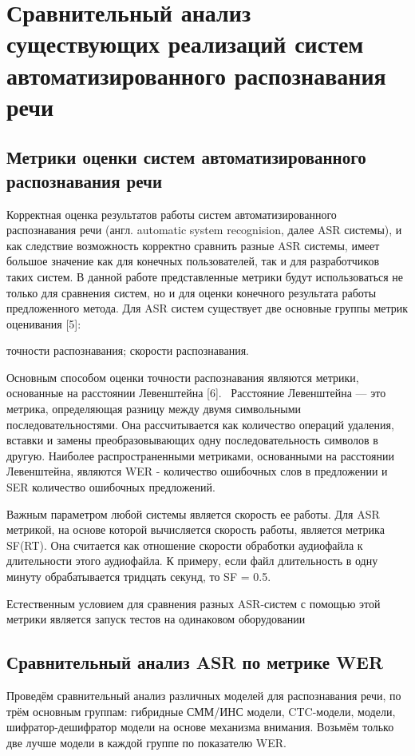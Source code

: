 \documentclass[conference]{IEEEtran}
\begin{document}
    \section{Сравнительный анализ существующих реализаций систем автоматизированного распознавания речи}

    \subsection{Метрики оценки систем автоматизированного распознавания речи}\label{AA}

    Корректная оценка результатов работы систем автоматизированного распознавания речи (англ. automatic system recognision, далее ASR системы), и как следствие возможность корректно сравнить разные ASR системы, имеет большое значение как для конечных пользователей, так и для разработчиков таких систем. В данной работе представленные метрики будут использоваться не только для сравнения систем, но и для оценки конечного результата работы предложенного метода.
    Для ASR систем существует две основные группы метрик оценивания [5]:
    \begin{itemize}
         точности распознавания;
         скорости распознавания.
    \end{itemize}

    Основным способом оценки точности распознавания являются метрики, основанные на расстоянии Левенштейна [6]. 
Расстояние Левенштейна — это метрика, определяющая разницу между двумя символьными последовательностями. Она рассчитывается как количество операций удаления, вставки и замены преобразовывающих одну последовательность символов в другую. Наиболее распространенными метриками, основанными на расстоянии Левенштейна, являются WER - количество ошибочных слов в предложении и SER количество ошибочных предложений.

Важным параметром любой системы является скорость ее работы. Для ASR метрикой, на основе которой вычисляется скорость работы, является метрика SF(RT). Она считается как отношение скорости обработки аудиофайла к длительности этого аудиофайла. К примеру, если файл длительность в одну минуту обрабатывается тридцать секунд, то SF = 0.5.

Естественным условием для сравнения разных ASR-систем с помощью этой метрики является запуск тестов на одинаковом оборудовании

\subsection{Сравнительный анализ ASR по метрике WER}\label{AA}
Проведём сравнительный анализ различных моделей для распознавания речи, по трём основным группам: гибридные СММ/ИНС модели, CTC-модели, модели, шифратор-дешифратор модели на основе механизма внимания. Возьмём только две лучше модели в каждой группе по показателю WER.
\end{document}
